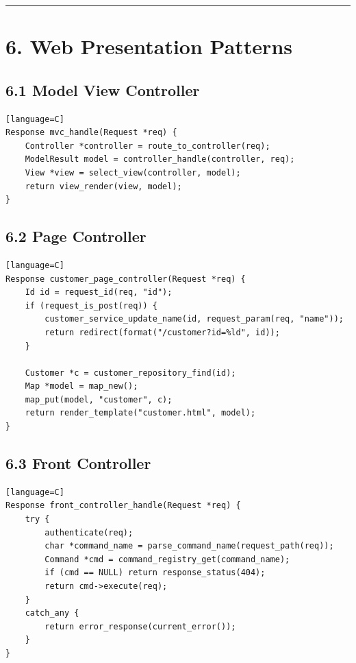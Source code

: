 \documentclass[11pt]{article}
\begin{document}
\begin{center}\rule{0.5\linewidth}{0.5pt}\end{center}

\section{6. Web Presentation Patterns}\label{web-presentation-patterns}

\subsection{6.1 Model View Controller}\label{model-view-controller}

\begin{verbatim}[language=C]
Response mvc_handle(Request *req) {
    Controller *controller = route_to_controller(req);
    ModelResult model = controller_handle(controller, req);
    View *view = select_view(controller, model);
    return view_render(view, model);
}
\end{verbatim}

\subsection{6.2 Page Controller}\label{page-controller}

\begin{verbatim}[language=C]
Response customer_page_controller(Request *req) {
    Id id = request_id(req, "id");
    if (request_is_post(req)) {
        customer_service_update_name(id, request_param(req, "name"));
        return redirect(format("/customer?id=%ld", id));
    }

    Customer *c = customer_repository_find(id);
    Map *model = map_new();
    map_put(model, "customer", c);
    return render_template("customer.html", model);
}
\end{verbatim}

\subsection{6.3 Front Controller}\label{front-controller}

\begin{verbatim}[language=C]
Response front_controller_handle(Request *req) {
    try {
        authenticate(req);
        char *command_name = parse_command_name(request_path(req));
        Command *cmd = command_registry_get(command_name);
        if (cmd == NULL) return response_status(404);
        return cmd->execute(req);
    }
    catch_any {
        return error_response(current_error());
    }
}
\end{verbatim}
\end{document}
